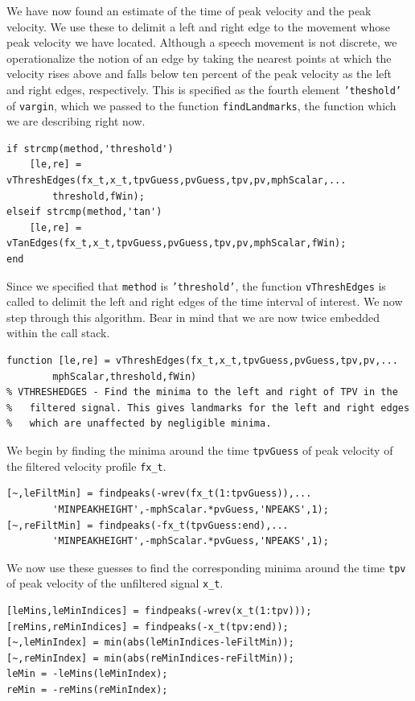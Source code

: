 \documentclass[a4paper, 12pt]{article}
\begin{document}
We have now found an estimate of the time of peak velocity and the peak velocity. We use these to delimit a left and right edge to the movement whose peak velocity we have located. Although a speech movement is not discrete, we operationalize the notion of an edge by taking the nearest points at which the velocity rises above and falls below ten percent of the peak velocity as the left and right edges, respectively. This is specified as the fourth element \texttt{'theshold'} of \texttt{vargin}, which we passed to the function \texttt{findLandmarks}, the function which we are describing right now.
\begin{verbatim}
if strcmp(method,'threshold')
    [le,re] = vThreshEdges(fx_t,x_t,tpvGuess,pvGuess,tpv,pv,mphScalar,...
        threshold,fWin);
elseif strcmp(method,'tan')
    [le,re] = vTanEdges(fx_t,x_t,tpvGuess,pvGuess,tpv,pv,mphScalar,fWin);
end
\end{verbatim}
Since we specified that \texttt{method} is \texttt{'threshold'}, the function \texttt{vThreshEdges} is called to delimit the left and right edges of the time interval of interest. We now step through this algorithm. Bear in mind that we are now twice embedded within the call stack.
\begin{verbatim}
function [le,re] = vThreshEdges(fx_t,x_t,tpvGuess,pvGuess,tpv,pv,...
        mphScalar,threshold,fWin)
% VTHRESHEDGES - Find the minima to the left and right of TPV in the 
%   filtered signal. This gives landmarks for the left and right edges 
%   which are unaffected by negligible minima.
\end{verbatim}
We begin by finding the minima around the time \texttt{tpvGuess} of peak velocity of the filtered velocity profile \texttt{fx\_t}.
\begin{verbatim}
[~,leFiltMin] = findpeaks(-wrev(fx_t(1:tpvGuess)),...
        'MINPEAKHEIGHT',-mphScalar.*pvGuess,'NPEAKS',1);
[~,reFiltMin] = findpeaks(-fx_t(tpvGuess:end),...
        'MINPEAKHEIGHT',-mphScalar.*pvGuess,'NPEAKS',1);
\end{verbatim}
We now use these guesses to find the corresponding minima around the time \texttt{tpv} of peak velocity of the unfiltered signal \texttt{x\_t}.
\begin{verbatim}
[leMins,leMinIndices] = findpeaks(-wrev(x_t(1:tpv)));
[reMins,reMinIndices] = findpeaks(-x_t(tpv:end));
[~,leMinIndex] = min(abs(leMinIndices-leFiltMin));
[~,reMinIndex] = min(abs(reMinIndices-reFiltMin));
leMin = -leMins(leMinIndex);
reMin = -reMins(reMinIndex);
\end{verbatim}
\end{document}
